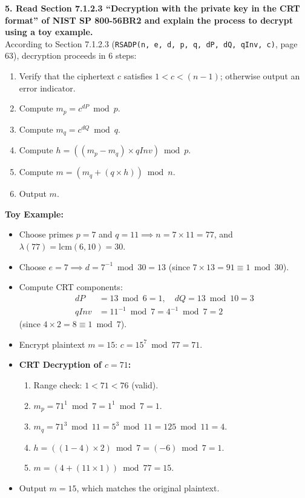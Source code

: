 \documentclass[10pt,twocolumn,letterpaper]{article}
\begin{document}
\vspace{0.5em}
\noindent\textbf{5. Read Section 7.1.2.3 ``Decryption with the private key in the CRT format'' of NIST SP 800-56BR2 and explain the process to decrypt using a toy example.} \\
According to Section 7.1.2.3 (\texttt{RSADP(n, e, d, p, q, dP, dQ, qInv, c)}, page 63), decryption proceeds in 6 steps:
\begin{enumerate}
    \item Verify that the ciphertext $c$ satisfies $1 < c < (n - 1)$; otherwise output an error indicator.
    \item Compute $m_p = c^{dP} \bmod p$.
    \item Compute $m_q = c^{dQ} \bmod q$.
    \item Compute $h = ((m_p - m_q) \times qInv) \bmod p$.
    \item Compute $m = (m_q + (q \times h)) \bmod n$.
    \item Output $m$.
\end{enumerate}

\noindent\textbf{Toy Example:}
\begin{itemize}
    \item Choose primes $p = 7$ and $q = 11 \implies n = 7 \times 11 = 77$, and $\lambda(77) = \text{lcm}(6, 10) = 30$.
    \item Choose $e = 7 \implies d = 7^{-1} \bmod 30 = 13$ (since $7 \times 13 = 91 \equiv 1 \bmod 30$).
    \item Compute CRT components:
    \begin{align*}
        dP &= 13 \bmod 6 = 1, \quad dQ = 13 \bmod 10 = 3 \\
        qInv &= 11^{-1} \bmod 7 = 4^{-1} \bmod 7 = 2
    \end{align*}
    (since $4 \times 2 = 8 \equiv 1 \bmod 7$).
    \item Encrypt plaintext $m = 15$: $c = 15^7 \bmod 77 = 71$.
    \item \textbf{CRT Decryption of $c = 71$:}
    \begin{enumerate}
        \item Range check: $1 < 71 < 76$ (valid).
        \item $m_p = 71^1 \bmod 7 = 1^1 \bmod 7 = 1$.
        \item $m_q = 71^3 \bmod 11 = 5^3 \bmod 11 = 125 \bmod 11 = 4$.
        \item $h = ((1 - 4) \times 2) \bmod 7 = (-6) \bmod 7 = 1$.
        \item $m = (4 + (11 \times 1)) \bmod 77 = 15$.
    \end{enumerate}
    \item Output $m = 15$, which matches the original plaintext.
\end{itemize}
\end{document}
